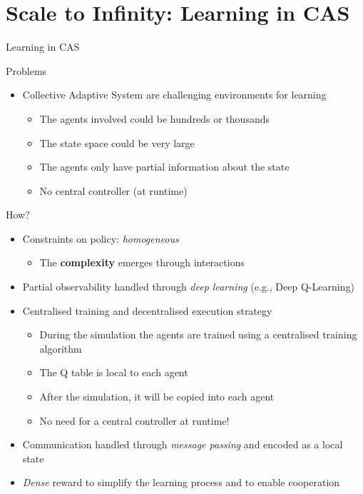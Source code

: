 \documentclass[presentation, 8pt]{beamer}\mode<presentation>{\usetheme{AMSBolognaFC}}
\begin{document}
\section{Scale to \textbf{Infinity}: Learning in CAS}
\begin{frame}{Learning in CAS}
	\begin{alertblock}{Problems}
		\begin{itemize}
			\item Collective Adaptive System are challenging environments for learning
			\begin{itemize}
				\item The agents involved could be hundreds or thousands
				\item The state space could be very large
				\item The agents only have partial information about the state
				\item No central controller (at runtime)
			\end{itemize}
		\end{itemize}
	\end{alertblock}
	
	\begin{alertblock}{How?}
		\begin{itemize}
			\item Constraints on policy: \emph{homogeneous}
			\begin{itemize}
				\item The \textbf{complexity} emerges through interactions
			\end{itemize}
			\item Partial observability handled through \emph{deep learning} (e.g., Deep Q-Learning)
			\item Centralised training and decentralised execution strategy
			\begin{itemize}
				\item During the simulation the agents are trained using a centralised training algorithm
				\item The Q table is local to each agent
				\item After the simulation, it will be copied into each agent
				\item No need for a central controller at runtime!
			\end{itemize}
			\item Communication handled through \emph{message passing} and encoded as a local state
			\item \emph{Dense} reward to simplify the learning process and to enable cooperation
		\end{itemize}
	\end{alertblock}
\end{frame}
\end{document}
